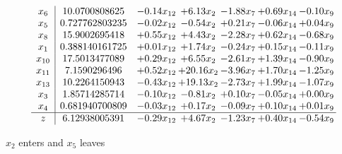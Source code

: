 \documentclass[9pt]{article}
\begin{document}
 \[\begin{array}{c| c c@{\hskip 2pt} c@{\hskip 2pt} c@{\hskip 2pt} c@{\hskip 2pt} c@{\hskip 2pt} }
 x_{6}   &  10.0700808625 & -0.14 x_{12} & +  6.13 x_{2} & -1.88 x_{7} & +  0.69 x_{14} & -0.10 x_{9}\\
 x_{5}   &  0.727762803235 & -0.02 x_{12} & -0.54 x_{2} & +  0.21 x_{7} & -0.06 x_{14} & +  0.04 x_{9}\\
 x_{8}   &  15.9002695418 & +  0.55 x_{12} & +  4.43 x_{2} & -2.28 x_{7} & +  0.62 x_{14} & -0.68 x_{9}\\
 x_{1}   &  0.388140161725 & +  0.01 x_{12} & +  1.74 x_{2} & -0.24 x_{7} & +  0.15 x_{14} & -0.11 x_{9}\\
 x_{10}   &  17.5013477089 & +  0.29 x_{12} & +  6.55 x_{2} & -2.61 x_{7} & +  1.39 x_{14} & -0.90 x_{9}\\
 x_{11}   &  7.1590296496 & +  0.52 x_{12} & + 20.16 x_{2} & -3.96 x_{7} & +  1.70 x_{14} & -1.25 x_{9}\\
 x_{13}   &  10.2264150943 & -0.43 x_{12} & + 19.13 x_{2} & -2.73 x_{7} & +  1.99 x_{14} & -1.07 x_{9}\\
 x_{3}   &  1.85714285714 & -0.10 x_{12} & -0.81 x_{2} & +  0.10 x_{7} & -0.05 x_{14} & +  0.00 x_{9}\\
 x_{4}   &  0.681940700809 & -0.03 x_{12} & +  0.17 x_{2} & -0.09 x_{7} & +  0.10 x_{14} & +  0.01 x_{9}\\
\hline
z    &  6.12938005391 & -0.29 x_{12} & +  4.67 x_{2} & -1.23 x_{7} & +  0.40 x_{14} & -0.54 x_{9}\\
\end{array}\]


 $ x_{2} $ enters and $ x_{5} $ leaves 
\end{document}
